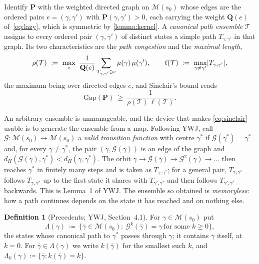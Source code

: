 \documentclass[aos]{imsart}
\DeclarePairedDelimiter{\abs}{\lvert}{\rvert}
\theoremstyle{plain}
\theoremstyle{definition}
\newtheorem{definition}{Definition}[section]
\begin{document}
    Identify $\mathbf{P}$ with the weighted directed graph on
    $\mathscr{M}(s_0)$ whose edges are the ordered pairs
    $e=(\gamma,\gamma')$ with $\mathbf{P}(\gamma,\gamma')>0$, each
    carrying the weight $\mathbf{Q}(e)$ of~\eqref{eq:lazy}, which is
    symmetric by \cref{lemma:kernel}. A \emph{canonical path ensemble}
    $\mathcal{T}$ assigns to every ordered pair $(\gamma,\gamma')$ of
    distinct states a simple path $T_{\gamma,\gamma'}$ in that graph. Its
    two characteristics are the \emph{path congestion} and the
    \emph{maximal length},
    \begin{equation}
        \label{eq:congdef}
        \rho(\mathcal{T})\ \coloneq\ \max_{e}\ \frac{1}{\mathbf{Q}(e)}
        \sum_{T_{\gamma,\gamma'}\ni e}\mu(\gamma)\,\mu(\gamma'),
        \qquad
        \ell(\mathcal{T})\ \coloneq\ \max_{\gamma\neq\gamma'}
        \abs{T_{\gamma,\gamma'}},
    \end{equation}
    the maximum being over directed edges $e$, and Sinclair's bound
    \citep[Corollary~6$'$]{Sinclair1992} reads
    \begin{equation}
        \label{eq:sinclair}
        \mathrm{Gap}(\mathbf{P})\ \geq\
        \frac{1}{\rho(\mathcal{T})\,\ell(\mathcal{T})} .
    \end{equation}

    An arbitrary ensemble is unmanageable, and the device that makes
    \eqref{eq:sinclair} usable is to generate the ensemble from a map.
    Following YWJ, call
    $\mathcal{G}:\mathscr{M}(s_0)\to\mathscr{M}(s_0)$ a \emph{valid
    transition function} with centre $\gamma^{\ast}$ if
    $\mathcal{G}(\gamma^{\ast})=\gamma^{\ast}$ and, for every
    $\gamma\neq\gamma^{\ast}$, the pair $(\gamma,\mathcal{G}(\gamma))$ is an
    edge of the graph and
    $d_H(\mathcal{G}(\gamma),\gamma^{\ast})<d_H(\gamma,\gamma^{\ast})$. The
    orbit $\gamma\to\mathcal{G}(\gamma)\to\mathcal{G}^{2}(\gamma)\to\dots$
    then reaches $\gamma^{\ast}$ in finitely many steps and is taken as
    $T_{\gamma,\gamma^{\ast}}$; for a general pair, $T_{\gamma,\gamma'}$
    follows $T_{\gamma,\gamma^{\ast}}$ up to the first state it shares with
    $T_{\gamma',\gamma^{\ast}}$ and then follows $T_{\gamma',\gamma^{\ast}}$
    backwards. This is Lemma~1 of YWJ. The ensemble so obtained is
    \emph{memoryless}: how a path continues depends on the state it has
    reached and on nothing else.

    \begin{definition}[Precedents; YWJ, Section~4.1]
        \label{def:prec}
        For $\gamma\in\mathscr{M}(s_0)$ put
        \begin{equation}
            \label{eq:precdef}
            \Lambda(\gamma)\ \coloneq\
            \bigl\{\bar\gamma\in\mathscr{M}(s_0):\
            \mathcal{G}^{k}(\bar\gamma)=\gamma\ \text{for some }
            k\geq0\bigr\},
        \end{equation}
        the states whose canonical path to $\gamma^{\ast}$ passes through
        $\gamma$; it contains $\gamma$ itself, at $k=0$. For
        $\bar\gamma\in\Lambda(\gamma)$ we write $k(\bar\gamma)$ for the
        smallest such $k$, and
        $\Lambda_k(\gamma)\coloneq\{\bar\gamma:k(\bar\gamma)=k\}$.
    \end{definition}
\end{document}
